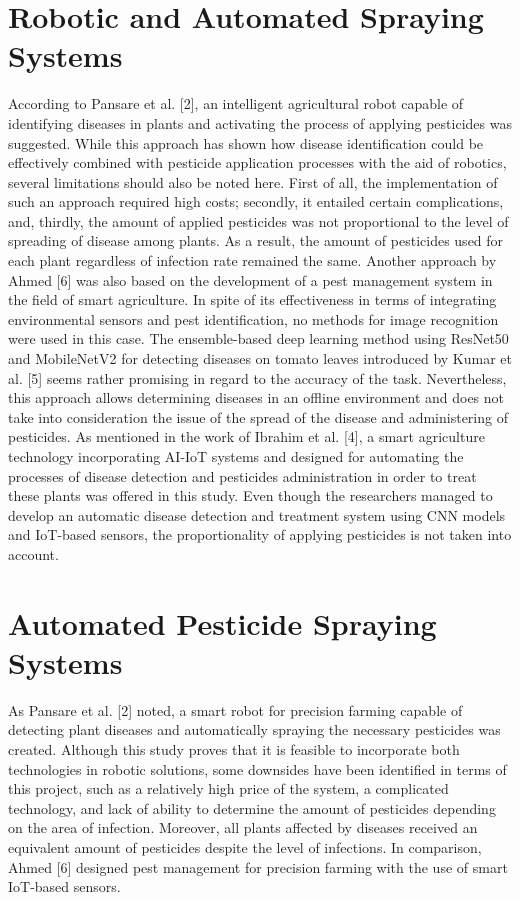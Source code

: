 \documentclass[12pt,a4paper,oneside]{report}
\begin{document}
\section{Robotic and Automated Spraying Systems}

According to Pansare et al. [2], an intelligent agricultural robot capable of identifying diseases in plants and activating the process of applying pesticides was suggested. While this approach has shown how disease identification could be effectively combined with pesticide application processes with the aid of robotics, several limitations should also be noted here. First of all, the implementation of such an approach required high costs; secondly, it entailed certain complications, and, thirdly, the amount of applied pesticides was not proportional to the level of spreading of disease among plants. As a result, the amount of pesticides used for each plant regardless of infection rate remained the same. Another approach by Ahmed [6] was also based on the development of a pest management system in the field of smart agriculture. In spite of its effectiveness in terms of integrating environmental sensors and pest identification, no methods for image recognition were used in this case. The ensemble-based deep learning method using ResNet50 and MobileNetV2 for detecting diseases on tomato leaves introduced by Kumar et al. [5] seems rather promising in regard to the accuracy of the task. Nevertheless, this approach allows determining diseases in an offline environment and does not take into consideration the issue of the spread of the disease and administering of pesticides.
As mentioned in the work of Ibrahim et al. [4], a smart agriculture technology incorporating AI-IoT systems and designed for automating the processes of disease detection and pesticides administration in order to treat these plants was offered in this study. Even though the researchers managed to develop an automatic disease detection and treatment system using CNN models and IoT-based sensors, the proportionality of applying pesticides is not taken into account.

\section{Automated Pesticide Spraying Systems}

As Pansare et al. [2] noted, a smart robot for precision farming capable of detecting plant diseases and automatically spraying the necessary pesticides was created. Although this study proves that it is feasible to incorporate both technologies in robotic solutions, some downsides have been identified in terms of this project, such as a relatively high price of the system, a complicated technology, and lack of ability to determine the amount of pesticides depending on the area of infection. Moreover, all plants affected by diseases received an equivalent amount of pesticides despite the level of infections. In comparison, Ahmed [6] designed pest management for precision farming with the use of smart IoT-based sensors.
\end{document}
